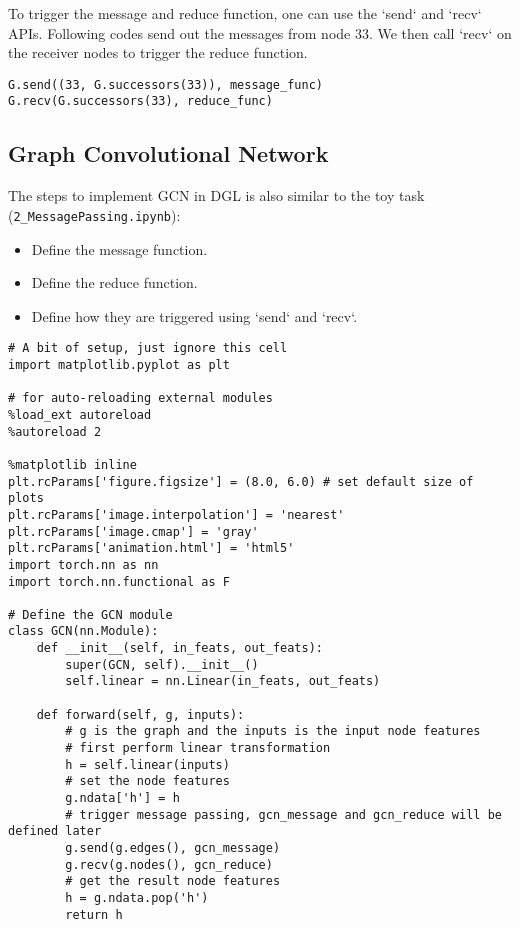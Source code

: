 To trigger the message and reduce function, one can use the `send` and `recv` APIs. Following codes send out the messages from node 33. We then call `recv` on the receiver nodes to trigger the reduce function.

\begin{verbatim}
G.send((33, G.successors(33)), message_func)
G.recv(G.successors(33), reduce_func)
\end{verbatim}

\subsection{Graph Convolutional Network}
The steps to implement GCN in DGL is also similar to the toy task (\verb|2_MessagePassing.ipynb|):

\begin{itemize}
    \item Define the message function.
\item Define the reduce function.
\item Define how they are triggered using `send` and `recv`.
\end{itemize}

\begin{verbatim}
# A bit of setup, just ignore this cell
import matplotlib.pyplot as plt

# for auto-reloading external modules
%load_ext autoreload
%autoreload 2

%matplotlib inline
plt.rcParams['figure.figsize'] = (8.0, 6.0) # set default size of plots
plt.rcParams['image.interpolation'] = 'nearest'
plt.rcParams['image.cmap'] = 'gray'
plt.rcParams['animation.html'] = 'html5'
import torch.nn as nn
import torch.nn.functional as F

# Define the GCN module
class GCN(nn.Module):
    def __init__(self, in_feats, out_feats):
        super(GCN, self).__init__()
        self.linear = nn.Linear(in_feats, out_feats)
    
    def forward(self, g, inputs):
        # g is the graph and the inputs is the input node features
        # first perform linear transformation
        h = self.linear(inputs)
        # set the node features
        g.ndata['h'] = h
        # trigger message passing, gcn_message and gcn_reduce will be defined later
        g.send(g.edges(), gcn_message)
        g.recv(g.nodes(), gcn_reduce)
        # get the result node features
        h = g.ndata.pop('h')
        return h
\end{verbatim}